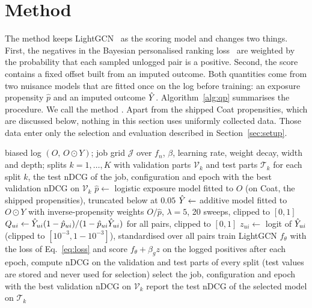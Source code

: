 \section{Method}\label{sec:method}

The method keeps LightGCN~\citep{he2020lightgcn} as the scoring model and changes two things.
First, the negatives in the Bayesian personalised ranking loss~\citep{rendle2009bpr} are
weighted by the probability that each sampled unlogged pair is a positive. Second, the score
contains a fixed offset built from an imputed outcome. Both quantities come from two nuisance
models that are fitted once on the log before training: an exposure propensity $\hat p$ and an
imputed outcome $\hat Y$. Algorithm~\ref{alg:qp} summarises the procedure. We call the method
\qp. Apart from the shipped Coat propensities, which are discussed below, nothing in this section
uses uniformly collected data. Those data enter only the selection and evaluation described in
Section~\ref{sec:setup}.

\begin{algorithm}[t]
\caption{\qp: training on the biased log with Q-weighted negatives and an imputation offset}\label{alg:qp}
\begin{algorithmic}[1]
\Require biased log $(O,\,O\odot Y)$; job grid $\mathcal J$ over $f_n$, $\beta$, learning rate,
weight decay, width and depth; splits $k=1,\dots,K$ with validation parts $\mathcal V_k$ and test
parts $\mathcal T_k$
\Ensure for each split $k$, the test nDCG of the job, configuration and epoch with the best
validation nDCG on $\mathcal V_k$
\State $\hat p \gets$ logistic exposure model fitted to $O$ (on Coat, the shipped propensities),
truncated below at $0.05$ 
\State $\hat Y \gets$ additive model fitted to $O\odot Y$ with inverse-propensity weights $O/\hat p$,
$\lambda=5$, 20 sweeps, clipped to $[0,1]$ 
\State $Q_{ui} \gets \hat Y_{ui}(1-\hat p_{ui})/(1-\hat p_{ui}\hat Y_{ui})$ for all pairs, clipped to $[0,1]$
\State $z_{ui} \gets$ logit of $\hat Y_{ui}$ (clipped to $[10^{-3},1-10^{-3}]$), standardised over all pairs
  \State train LightGCN $f_\theta$ with the loss of Eq.~\eqref{eq:loss} and score $f_\theta+\beta_g z$
  on the logged positives
  \State after each epoch, compute nDCG on the validation and test parts of every split
  (test values are stored and never used for selection)
\EndFor
{}
  \State select the job, configuration and epoch with the best validation nDCG on $\mathcal V_k$
  \State report the test nDCG of the selected model on $\mathcal T_k$
\EndFor
\end{algorithmic}
\end{algorithm}

